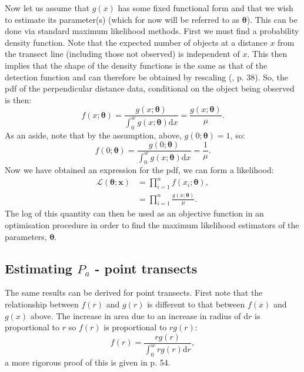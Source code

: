 Now let us assume that $g(x)$ has some fixed functional form and that we wish to estimate its parameter(s) (which for now will be referred to as $\bm{\theta}$). This can be done via standard maximum likelihood methods. First we must find a probability density function. Note that the expected number of objects at a distance $x$ from the transect line (including those not observed) is independent of $x$. This then implies that the shape of the density functions is the same as that of the detection function and can therefore be obtained by rescaling (\cite{IDS}, p. 38). So, the pdf of the perpendicular distance data, conditional on the object being observed is then:
\begin{equation}
f(x;\bm{\theta}) = \frac{g(x;\bm{\theta})}{\int_0^w g(x;\bm{\theta}) \text{d}x} = \frac{g(x;\bm{\theta})}{\mu}.
\end{equation}
As an aside, note that by the assumption, above, $g(0;\bm{\theta})=1$, so:
\begin{equation}
f(0;\bm{\theta}) = \frac{g(0;\bm{\theta})}{\int_0^w g(x;\bm{\theta}) \text{d}x} = \frac{1}{\mu}.
\end{equation}
Now we have obtained an expression for the pdf, we can form a likelihood:
\begin{align}
\mathcal{L}(\bm{\theta}; \bm{x}) &= \prod_{i=1}^n f(x_i;\bm{\theta}),\\
&= \prod_{i=1}^n \frac{g(x;\bm{\theta})}{\mu}.
\label{ds-lt-likelihood}
\end{align}
The log of this quantity can then be used as an objective function in an optimisation procedure in order to find the maximum likelihood estimators of the parameters, $\bm{\theta}$.

\subsection{Estimating $P_a$ - point transects} 
The same results can be derived for point transects. First note that the relationship between $f(r)$ and $g(r)$ is different to that between $f(x)$ and $g(x)$ above. The increase in area due to an increase in radius of $\text{d}r$ is proportional to $r$ so $f(r)$ is proportional to $rg(r)$:
\begin{equation}
f(r) = \frac{r g(r)}{\int_0^w r g(r) \text{d}r},
\end{equation}
a more rigorous proof of this is given in \cite{IDS} p. 54.

